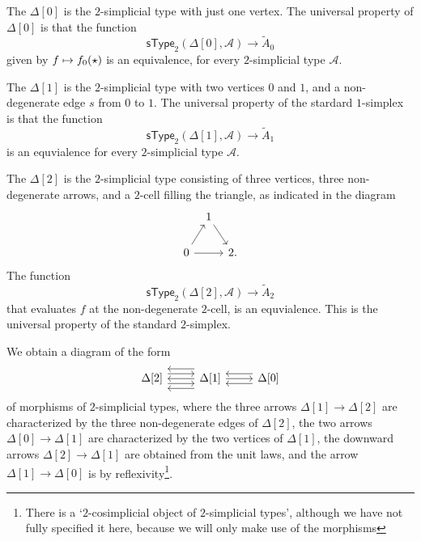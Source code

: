 \begin{eg}
The  $\Delta[0]$ is the $2$-simplicial type with just one vertex. The universal property of $\Delta[0]$ is that the function 
\begin{equation*}
\mathsf{sType}_2(\Delta[0],\mathcal{A}) \to \tilde{A}_0
\end{equation*}
given by $f\mapsto \pts{f}(\ttt)$ is an equivalence, for every $2$-simplicial type $\mathcal{A}$.

The  $\Delta[1]$ is the $2$-simplicial type with two vertices $0$ and $1$, and a non-degenerate edge $s$ from $0$ to $1$. The universal property of the stardard $1$-simplex is that the function
\begin{equation*}
\mathsf{sType}_2(\Delta[1],\mathcal{A}) \to \tilde{A}_1
\end{equation*}
is an equvialence for every $2$-simplicial type $\mathcal{A}$.

The  $\Delta[2]$ is the $2$-simplicial type consisting of three vertices, three non-degenerate arrows, and a $2$-cell filling the triangle, as indicated in the diagram
\begin{equation*}
\begin{tikzcd}[column sep=tiny]
& 1 \arrow[dr] \\
0 \arrow[ur] \arrow[rr] & & 2.
\end{tikzcd}
\end{equation*}
The function
\begin{equation*}
\mathsf{sType}_2(\Delta[2],\mathcal{A}) \to \tilde{A}_2
\end{equation*}
that evaluates $f$ at the non-degenerate $2$-cell, is an equvialence. This is the universal property of the standard $2$-simplex.

We obtain a diagram of the form
\begin{equation*}
\begin{tikzcd}
\Delta[2] \arrow[r,yshift=1ex] \arrow[r,yshift=-1ex] & \Delta[1] \arrow[l,yshift=2ex] \arrow[l] \arrow[l,yshift=-2ex] \arrow[r] & \Delta[0] \arrow[l,yshift=1ex] \arrow[l,yshift=-1ex]
\end{tikzcd}
\end{equation*}
of morphisms of $2$-simplicial types, where the three arrows $\Delta[1]\to\Delta[2]$ are characterized by the three non-degenerate edges of $\Delta[2]$, the two arrows $\Delta[0]\to\Delta[1]$ are characterized by the two vertices of $\Delta[1]$, the downward arrows $\Delta[2]\to\Delta[1]$ are obtained from the unit laws, and the arrow $\Delta[1]\to \Delta[0]$ is by reflexivity\footnote{There is a `$2$-cosimplicial object of $2$-simplicial types', although we have not fully specified it here, because we will only make use of the morphisms}.
\end{eg}

